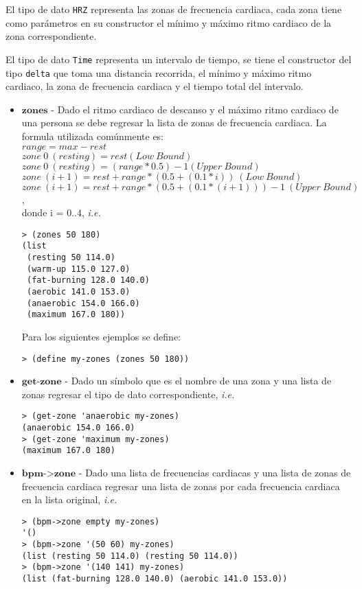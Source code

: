 \documentclass{article}
\begin{document}
El tipo de dato \verb;HRZ; representa las zonas de frecuencia cardiaca,
cada zona tiene como parámetros en su constructor el mínimo y máximo ritmo cardiaco
de la zona correspondiente.

El tipo de dato \verb;Time; representa un intervalo de tiempo, se tiene el constructor del tipo \verb;delta; que toma una distancia recorrida, el mínimo y máximo ritmo cardiaco, la zona de frecuencia cardiaca y el tiempo total del intervalo.

\begin{itemize}
\item $\textbf{zones}$ - Dado el ritmo cardiaco de descanso y el máximo ritmo cardiaco de una persona se debe regresar la lista de zonas de frecuencia cardiaca. La formula utilizada comúnmente es:\\
  $range = max - rest$\\
  $zone\ 0\ (resting) = rest (Low\ Bound)$\\
  $zone\ 0\ (resting) = (range * 0.5) - 1 (Upper\ Bound)$\\
  $zone\ (i+1) = rest + range * (0.5 + (0.1 * i))\ (Low\ Bound)$\\
  $zone\ (i+1) = rest + range * (0.5 + (0.1 * (i+1))) - 1\ (Upper\ Bound)$,\\
  donde i = $0..4$, \textit{i.e.}

\begin{verbatim}
> (zones 50 180)
(list
 (resting 50 114.0)
 (warm-up 115.0 127.0)
 (fat-burning 128.0 140.0)
 (aerobic 141.0 153.0)
 (anaerobic 154.0 166.0)
 (maximum 167.0 180))
\end{verbatim}

Para los siguientes ejemplos se define:
\begin{verbatim}
> (define my-zones (zones 50 180))
\end{verbatim}

\item $\textbf{get-zone}$ - Dado un símbolo que es el nombre de una zona y una lista de zonas regresar el tipo de dato correspondiente, \textit{i.e.}
\begin{verbatim}
> (get-zone 'anaerobic my-zones)
(anaerobic 154.0 166.0)
> (get-zone 'maximum my-zones)
(maximum 167.0 180)
\end{verbatim}

\item $\textbf{bpm->zone}$ - Dado una lista de frecuencias cardiacas y una lista de zonas de frecuencia cardiaca regresar una lista de zonas por cada frecuencia cardiaca en la lista original, \textit{i.e.}
\begin{verbatim}
> (bpm->zone empty my-zones)
'()
> (bpm->zone '(50 60) my-zones) 
(list (resting 50 114.0) (resting 50 114.0))
> (bpm->zone '(140 141) my-zones) 
(list (fat-burning 128.0 140.0) (aerobic 141.0 153.0))
\end{verbatim}


\end{itemize}
\end{document}
